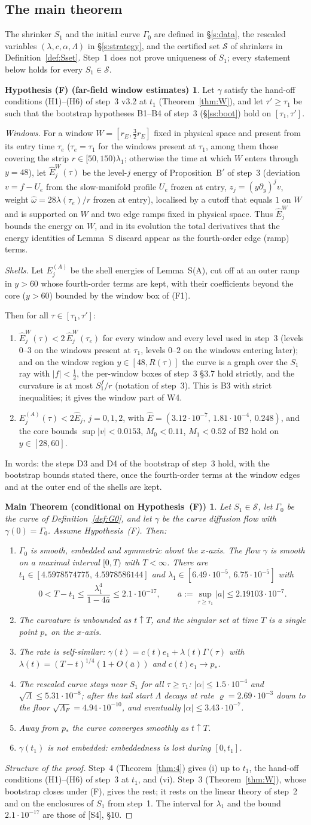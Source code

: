 \documentclass[11pt]{amsart}
\newtheorem*{maintheorem}{Main Theorem (conditional on Hypothesis~(F))}
\theoremstyle{definition}
\newtheorem*{hypF}{Hypothesis (F) (far-field window estimates)}
\theoremstyle{remark}
\newcommand{\Lam}{\Lambda}
\newcommand{\dref}[1]{[\textsf{#1}]}
\newcommand{\Sset}{\mathcal S}
\newcommand{\GAPSTATEMENT}{%
Let $\gamma$ satisfy the hand-off conditions \textup{(H1)--(H6)} of step~3 \textup{v3.2} at $t_1$ \textup{(Theorem~\ref{thm:W})}, and let $\tau'\ge\tau_1$ be such that the bootstrap hypotheses \textup{B1--B4} of step~3 \textup{(\S\ref{ss:boot})} hold on $[\tau_1,\tau']$.

\emph{Windows.} For a window $W=[r_E,\frac32r_E]$ fixed in physical space and present from its entry time $\tau_e$ \textup{(}$\tau_e=\tau_1$ for the windows present at $\tau_1$, among them those covering the strip $r\in[50,150)\lambda_1$; otherwise the time at which $W$ enters through $y=48$\textup{)}, let $\hat E^W_j(\tau)$ be the level-$j$ energy of Proposition~B$'$ of step~3 \textup{(}deviation $v=f-U_e$ from the slow-manifold profile $U_e$ frozen at entry, $z_j=(y\partial_y)^jv$, weight $\hat\omega=28\lambda(\tau_e)/r$ frozen at entry\textup{)}, localised by a cutoff that equals $1$ on $W$ and is supported on $W$ and two edge ramps fixed in physical space. Thus $\hat E^W_j$ bounds the energy on $W$, and in its evolution the total derivatives that the energy identities of Lemma~S discard appear as the fourth-order edge \textup{(}ramp\textup{)} terms.

\emph{Shells.} Let $E^{(A)}_j$ be the shell energies of Lemma~S\textup{(A)}, cut off at an outer ramp in $y>60$ whose fourth-order terms are kept, with their coefficients beyond the core \textup{(}$y>60$\textup{)} bounded by the window box of \textup{(F1)}.

Then for all $\tau\in[\tau_1,\tau']$:
\begin{enumerate}[label=\textup{(F\arabic*)},leftmargin=2.6em,itemsep=1pt]
\item $\hat E^W_j(\tau)<2\,\hat E^W_j(\tau_e)$ for every window and every level used in step~3 \textup{(}levels $0$--$3$ on the windows present at $\tau_1$, levels $0$--$2$ on the windows entering later\textup{)}; and on the window region $y\in[48,R(\tau)]$ the curve is a graph over the $S_1$ ray with $|f|<\frac12$, the per-window boxes of step~3 \textup{\S3.7} hold strictly, and the curvature is at most $S^f_1/r$ \textup{(}notation of step~3\textup{)}. This is \textup{B3} with strict inequalities; it gives the window part of \textup{W4}.
\item $E^{(A)}_j(\tau)<2\hat E_j$, $j=0,1,2$, with $\hat E=(3.12\cdot10^{-7},\,1.81\cdot10^{-4},\,0.248)$, and the core bounds $\sup|v|<0.0153$, $M_0<0.11$, $M_1<0.52$ of \textup{B2} hold on $y\in[28,60]$.
\end{enumerate}
In words: the steps \textup{D3} and \textup{D4} of the bootstrap of step~3 hold, with the bootstrap bounds stated there, once the fourth-order terms at the window edges and at the outer end of the shells are kept.}
\begin{document}
\subsection{The main theorem}\label{ss:main}
The shrinker $S_1$ and the initial curve $\Gamma_0$ are defined in \S\ref{s:data}, the rescaled variables $(\lambda,c,\alpha,\Lam)$ in \S\ref{s:strategy}, and the certified set $\Sset$ of shrinkers in Definition~\ref{def:Sset}. Step~1 does not prove uniqueness of $S_1$; every statement below holds for every $S_1\in\Sset$.

\begin{hypF}
\GAPSTATEMENT
\end{hypF}

\begin{maintheorem}
Let $S_1\in\Sset$, let $\Gamma_0$ be the curve of Definition~\ref{def:G0}, and let $\gamma$ be the curve diffusion flow with $\gamma(0)=\Gamma_0$. Assume Hypothesis~\textup{(F)}. Then:
\begin{enumerate}[label=\textup{(\roman*)},leftmargin=*,itemsep=1pt]
\item $\Gamma_0$ is smooth, embedded and symmetric about the $x$-axis. The flow $\gamma$ is smooth on a maximal interval $[0,T)$ with $T<\infty$. There are $t_1\in[4.5978574775,\,4.5978586144]$ and $\lambda_1\in[6.49\cdot10^{-5},\,6.75\cdot10^{-5}]$ with
\[
0<T-t_1\le\frac{\lambda_1^4}{1-4\bar a}\le2.1\cdot10^{-17},\qquad\bar a:=\sup_{\tau\ge\tau_1}|a|\le2.19103\cdot10^{-7}.
\]
\item The curvature is unbounded as $t\uparrow T$, and the singular set at time $T$ is a single point $p_*$ on the $x$-axis.
\item The rate is self-similar: $\gamma(t)=c(t)e_1+\lambda(t)\Gamma(\tau)$ with $\lambda(t)=(T-t)^{1/4}(1+O(\bar a))$ and $c(t)e_1\to p_*$.
\item The rescaled curve stays near $S_1$ for all $\tau\ge\tau_1$: $|\alpha|\le1.5\cdot10^{-4}$ and $\sqrt\Lam\le5.31\cdot10^{-8}$; after the tail start $\Lam$ decays at rate $\varrho=2.69\cdot10^{-3}$ down to the floor $\sqrt{\Lam_F}=4.94\cdot10^{-10}$, and eventually $|\alpha|\le3.43\cdot10^{-7}$.
\item Away from $p_*$ the curve converges smoothly as $t\uparrow T$.
\item $\gamma(t_1)$ is not embedded: embeddedness is lost during $[0,t_1]$.
\end{enumerate}
\end{maintheorem}

\begin{proof}[Structure of the proof]
Step~4 (Theorem~\ref{thm:4}) gives (i) up to $t_1$, the hand-off conditions (H1)--(H6) of step~3 at $t_1$, and (vi). Step~3 (Theorem~\ref{thm:W}), whose bootstrap closes under (F), gives the rest; it rests on the linear theory of step~2 and on the enclosures of $S_1$ from step~1. The interval for $\lambda_1$ and the bound $2.1\cdot10^{-17}$ are those of \dref{S4}, \S10.
\end{proof}
\end{document}
